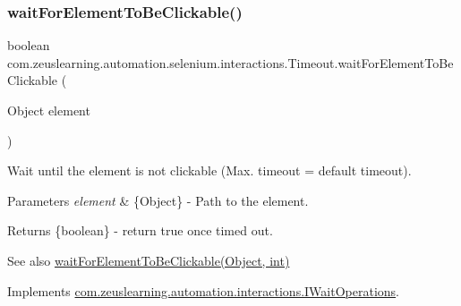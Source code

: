 \subsubsection{\texorpdfstring{wait\+For\+Element\+To\+Be\+Clickable()}{waitForElementToBeClickable()}\hspace{0.1cm}{\footnotesize\ttfamily [1/2]}}
{\footnotesize\ttfamily boolean com.\+zeuslearning.\+automation.\+selenium.\+interactions.\+Timeout.\+wait\+For\+Element\+To\+Be\+Clickable (\begin{DoxyParamCaption}\item[{Object}]{element }\end{DoxyParamCaption})\hspace{0.3cm}{\ttfamily [inline]}}

Wait until the element is not clickable (Max. timeout = default timeout).


\begin{DoxyParams}{Parameters}
{\em element} & \{Object\} -\/ Path to the element.\\
\hline
\end{DoxyParams}
\begin{DoxyReturn}{Returns}
\{boolean\} -\/ return {\ttfamily true} once timed out.
\end{DoxyReturn}
\begin{DoxySeeAlso}{See also}
\hyperlink{classcom_1_1zeuslearning_1_1automation_1_1selenium_1_1interactions_1_1Timeout_a704a4c52aeb1fc87555e0f17b2a86cfe}{wait\+For\+Element\+To\+Be\+Clickable(\+Object, int)} 
\end{DoxySeeAlso}


Implements \hyperlink{interfacecom_1_1zeuslearning_1_1automation_1_1interactions_1_1IWaitOperations_a224899aff622d5bbc4f7e76761413dc9}{com.\+zeuslearning.\+automation.\+interactions.\+I\+Wait\+Operations}.

